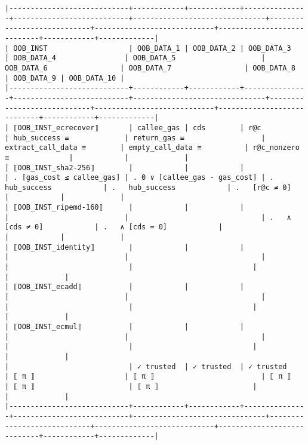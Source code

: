\documentclass[varwidth=\maxdimen,margin=0.5cm,multi={verbatim}]{standalone}
\begin{document}
\begin{verbatim}
|----------------------------+------------+------------+---------------+---------------------------+-------------------------------+----------------------------+----------------------------+----------------------------+------------+-------------|
| OOB_INST                   | OOB_DATA_1 | OOB_DATA_2 | OOB_DATA_3    | OOB_DATA_4                | OOB_DATA_5                    | OOB_DATA_6                 | OOB_DATA_7                 | OOB_DATA_8                 | OOB_DATA_9 | OOB_DATA_10 |
|----------------------------+------------+------------+---------------+---------------------------+-------------------------------+----------------------------+----------------------------+----------------------------+------------+-------------|
| ⟦OOB_INST_ecrecover⟧       | callee_gas | cds        | r@c           | hub_success ≡             | return_gas ≡                  | extract_call_data ≡        | empty_call_data ≡          | r@c_nonzero ≡              |            |             |
| ⟦OOB_INST_sha2-256⟧        |            |            |               | . [gas_cost ≤ callee_gas] | . 0 ∨ [callee_gas - gas_cost] | .   hub_success            | .   hub_success            | .   [r@c ≠ 0]              |            |             |
| ⟦OOB_INST_ripemd-160⟧      |            |            |               |                           |                               | .   ∧ [cds ≠ 0]            | .   ∧ [cds = 0]            |                            |            |             |
| ⟦OOB_INST_identity⟧        |            |            |               |                           |                               |                            |                            |                            |            |             |
| ⟦OOB_INST_ecadd⟧           |            |            |               |                           |                               |                            |                            |                            |            |             |
| ⟦OOB_INST_ecmul⟧           |            |            |               |                           |                               |                            |                            |                            |            |             |
|                            | ✓ trusted  | ✓ trusted  | ✓ trusted     | ⟦ π ⟧                     | ⟦ π ⟧                         | ⟦ π ⟧                      | ⟦ π ⟧                      | ⟦ π ⟧                      |            |             |
|----------------------------+------------+------------+---------------+---------------------------+-------------------------------+----------------------------+----------------------------+----------------------------+------------+-------------|

\end{verbatim}
\end{document}
